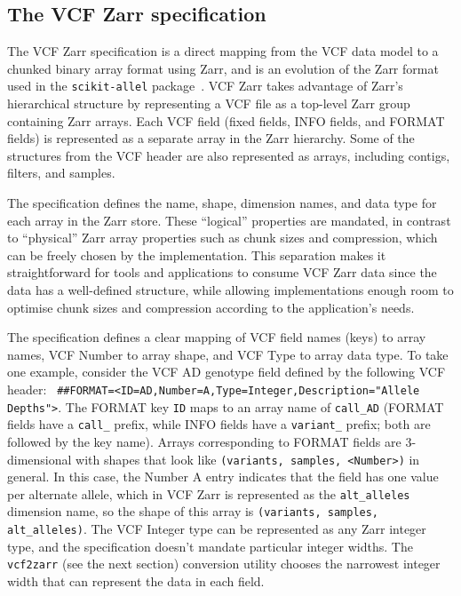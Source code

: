 \documentclass[a4paper,num-refs]{oup-contemporary}
\begin{document}
\subsection{The VCF Zarr specification}
The VCF Zarr specification is a direct mapping from the VCF data model
to a chunked binary array format using Zarr,
and is an evolution of the Zarr format used in the \texttt{scikit-allel}
package~\citep{miles2023scikit}.
VCF Zarr takes advantage
of Zarr's hierarchical structure by representing a VCF file as a top-level
Zarr group containing Zarr arrays. Each VCF field (fixed fields, INFO fields,
and FORMAT fields) is represented as a separate array in the Zarr hierarchy.
Some of the structures from the VCF header are also represented as arrays,
including contigs, filters, and samples.

The specification defines the name, shape, dimension names, and data type
for each array in the Zarr store. These ``logical'' properties are mandated,
in contrast to ``physical'' Zarr array properties such as chunk sizes and
compression, which can be freely chosen by the implementation. This
separation makes it straightforward for tools and applications to consume
VCF Zarr data since the data has a well-defined structure, while allowing
implementations enough room to optimise chunk sizes and compression
according to the application's needs.

The specification defines a clear mapping of VCF field names (keys) to
array names, VCF Number to array shape, and VCF Type to array data type.
To take one example, consider the VCF AD genotype field defined by the
following VCF header: \texttt{
\#\#FORMAT=<ID=AD,Number=A,Type=Integer,Description="Allele Depths">}.
The FORMAT key \texttt{ID} maps to an array name of \texttt{call\_AD}
(FORMAT fields have a \texttt{call\_} prefix, while INFO fields have a
\texttt{variant\_} prefix; both are followed by the key name). Arrays
corresponding to FORMAT fields are 3-dimensional with shapes that look
like \texttt{(variants, samples, <Number>)} in general. In this case, the
Number A entry indicates that the field has one value per alternate allele,
which in VCF Zarr is represented as the \texttt{alt\_alleles} dimension name,
so the shape of this array is \texttt{(variants, samples, alt\_alleles)}.
The VCF Integer type can be represented as any Zarr integer type,
and the specification doesn't mandate particular integer widths.
The \texttt{vcf2zarr} (see the next section) conversion utility
chooses the narrowest integer width that can represent the data in
each field.
\end{document}
